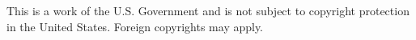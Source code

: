 \vspace*{5cm}
\begin{center}
This is a work of the U.S. Government and is not subject to copyright protection in the United States. Foreign copyrights may apply.
\end{center}
\thispagestyle{empty}
\clearpage
